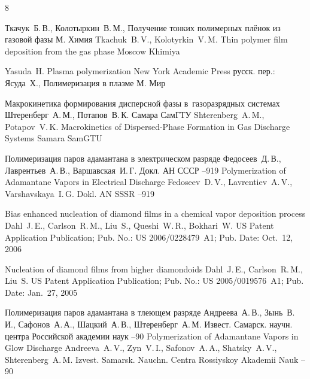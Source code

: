 \begin{thebibliography}{8}

\by Ткачук~Б.\,В., Колотыркин~В.\,М., 
\book Получение тонких полимерных плёнок из газовой фазы 
\publaddr М. 
\publ Химия 
\misctransl
\by  Tkachuk~B.\,V., Kolotyrkin~V.\,M.
\book Thin polymer film deposition from the gas phase
\publaddr Moscow 
\publ Khimiya

\by Yasuda~H.
\book Plasma polymerization
\publaddr New York
\publ Academic Press
\rtransl русск. пер.:~
\by Ясуда~Х., 
\book Полимеризация в плазме 
\publaddr М. 
\publ Мир 

\book Макрокинетика формирования дисперсной фазы в~газоразрядных системах
\by Штеренберг~А.\,М., Потапов~В.\,К.
\publ Самара
\publaddr СамГТУ
\misctransl
\by Shterenberg~A.\,M., Potapov~V.\,K.
\book Macrokinetics of Dispersed-Phase Formation in Gas Discharge Systems
\publaddr Samara
\publ SamGTU

\paper Полимеризация паров адамантана в электрическом разряде
\by Федосеев~Д.\,В., Лаврентьев~А.\,В., Варшавская~И.\,Г.
\jour Докл. АН СССР
--919
\misctransl
\paper Polymerization of Adamantane Vapors in Electrical Discharge
\by Fedoseev~D.\,V., Lavrentiev~A.\,V., Varshavskaya~I.\,G.
\jour Dokl. AN SSSR
--919


\preprint Bias enhanced nucleation of diamond films in a chemical vapor deposition process
\by     Dahl~J.\,E., Carlson~R.\,M., Liu~S., Queshi~W.\,R., Bokhari~W.
\preprintinfo US Patent Application Publication; Pub. No.: US 2006/0228479~A1; Pub.  Date: Oct.~12, 2006


\preprint Nucleation of diamond films from higher diamondoids
\by     Dahl~J.\,E., Carlson~R.\,M., Liu~S.
\preprintinfo US Patent Application Publication; Pub. No.: US 2005/0019576~A1; Pub.  Date: Jan.~27, 2005

\paper Полимеризация паров адамантана в тлеющем разряде
\by Андреева~А.\,В., Зынь~В.\,И., Сафонов~А.\,А., Шацкий~А.\,В., Штеренберг~А.\,М.
\jour  Извест. Самарск. научн. центра Российской академии наук
--90
\misctransl
\paper  Polymerization of Adamantane Vapors in Glow  Discharge
\by Andreeva~A.\,V., Zyn~V.\,I., Safonov~A.\,A.,  Shatsky~A.\,V., Shterenberg~A.\,M.
\jour  Izvest. Samarsk. Nauchn. Centra Rossiyskoy  Akademii Nauk 
--90




\end{thebibliography}
